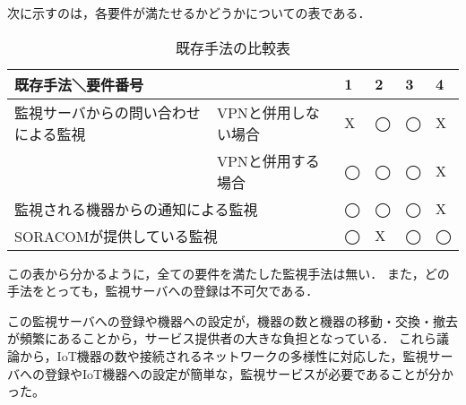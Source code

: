 	次に示すのは，各要件が満たせるかどうかについての表である．\\
	\begin{table}[htbp]
	\caption{既存手法の比較表}
	\begin{tabular}{|l|l|l|l|l|l|} \hline
		\multicolumn{2}{|l|}{既存手法＼要件番号} & 1 & 2 & 3 & 4\\ \hline \hline
		監視サーバからの問い合わせによる監視 & VPNと併用しない場合 & X & ◯ & ◯ & X  \\ \cline{2-6}
			& VPNと併用する場合 & ◯ & ◯ & ◯ & X \\ \hline
		\multicolumn{2}{|l|}{監視される機器からの通知による監視} & ◯ & ◯ & ◯ & X \\ \hline
		\multicolumn{2}{|l|}{SORACOMが提供している監視} & ◯ & X & ◯ & ◯ \\ \hline
	\end{tabular}
	\end{table}
	この表から分かるように，全ての要件を満たした監視手法は無い．
	また，どの手法をとっても，監視サーバへの登録は不可欠である．

	この監視サーバへの登録や機器への設定が，機器の数と機器の移動・交換・撤去が頻繁にあることから，サービス提供者の大きな負担となっている．
	これら議論から，IoT機器の数や接続されるネットワークの多様性に対応した，監視サーバへの登録やIoT機器への設定が簡単な，監視サービスが必要であることが分かった。

